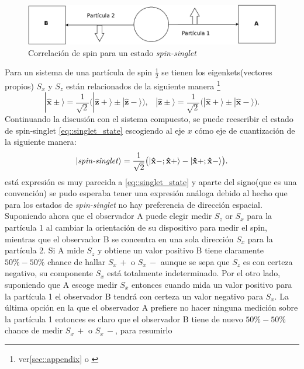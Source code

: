 \documentclass[a4paper]{article}
\begin{document}
\begin{figure}[h]
\begin{center}
\includegraphics[scale=0.27]{./spin_correlation_spin_singlet.png} 
\end{center} 
\caption{Correlación de spin para un estado \textit{spin-singlet}}
\label{fig::spin_correlation_spin_singlet}
\end{figure}
Para un sistema de una partícula de spin $\frac{1}{2}$ se tienen los  eigenkets(vectores propios) $S_x$ y $S_z$ están relacionados de la siguiente manera \footnote{ver\ref{sec::appendix} o \cite{Sakurai}}
\begin{equation}
|\mathbf{\hat{x}\pm}\rangle=\frac{1}{\sqrt{2}}\big (|\mathbf{\hat{z}+}\rangle \pm |\mathbf{\hat{z}-}\rangle  \big),\,\,\,\,\,|\mathbf{\hat{z}\pm}\rangle=\frac{1}{\sqrt{2}}\big (|\mathbf{\hat{x}+}\rangle \pm |\mathbf{\hat{x}-}\rangle  \big).
\end{equation}
Continuando la discusión con el sistema compuesto, se puede reescribir el estado de spin-singlet \ref{eq::singlet_state} escogiendo al eje $x$ cómo eje de cuantización de la siguiente manera:
\begin{equation}
|\text{\textit{spin-singlet}}\rangle=\frac{1}{\sqrt{2}}\big( |\mathbf{\hat{x}}-;\mathbf{\hat{x}}+\rangle -|\mathbf{\hat{x}}+;\mathbf{\hat{x}}-\rangle  \big).
\end{equation}
está expresión es muy parecida a \ref{eq::singlet_state} y aparte del signo(que es una convención) se pudo esperaba tener una expresión análoga debido al hecho que para los estados de \textit{spin-singlet} no hay preferencia de dirección espacial. Suponiendo ahora que el observador A puede elegir medir $S_z$ or $S_x$ para la partícula 1 al cambiar la orientación de su dispositivo para medir el spin, mientras que el observador B se concentra en una sola dirección $S_x$ para la partícula 2. Si A mide $S_z$ y obtiene un valor positivo B tiene claramente $50\%-50\%$ chance de hallar $S_x\, +$ o $S_x\,-$ aunque se sepa que $S_z$ es con certeza negativo, su componente $S_x$ está totalmente indeterminado. Por el otro lado, suponiendo que A escoge medir $S_x$ entonces cuando mida un valor positivo para la partícula 1 el observador B tendrá con certeza un valor negativo para $S_x$. La última opción en la que el observador A prefiere no hacer ninguna medición sobre la partícula 1 entonces es claro que el observador B tiene de nuevo $50\%-50\%$ chance de medir $S_x\,+$ o $S_x\,-$, para resumirlo
\end{document}
